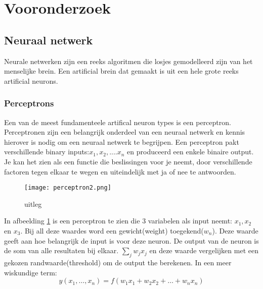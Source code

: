 \section{Vooronderzoek}

\subsection{Neuraal netwerk}
Neurale netwerken zijn een reeks algoritmen die losjes gemodelleerd zijn van het menselijke brein. Een artificial brein dat gemaakt is uit een hele grote reeks artificial neurons.

\subsubsection{Perceptrons}
Een van de meest fundamenteele artifical neuron types is een perceptron. Perceptronen zijn een belangrijk onderdeel van een neuraal netwerk en kennis hierover is nodig om een neuraal netwerk te begrijpen. Een perceptron pakt verschillende binary inputs:$x_{1}, x_{2},....x_{n}$ en produceerd een enkele binaire output. Je kan het zien als een functie die beslissingen voor je neemt, door verschillende factoren tegen elkaar te wegen en uiteindelijk met ja of nee te antwoorden.
\begin{figure}[h!]
\centering
\texttt{[image: perceptron2.png]}
\caption{uitleg}
\label{peceptron2}
\end{figure}
\linebreak
In afbeelding \ref{peceptron2} is een perceptron te zien die 3 variabelen als input neemt: $x_{1}, x_{2}$ en $x_{3}.$ Bij all deze waardes word een gewicht(weight) toegekend($w_{n}$). Deze waarde geeft aan hoe belangrijk de input is voor deze neuron. De output van de neuron is de som van alle resultaten bij elkaar. $\sum_{j}w_{j}x_{j}$ en deze waarde vergelijken met een gekozen randwaarde(threshold) om de output the berekenen. In een meer wiskundige term:
 \begin{equation}
    y(x_1,\ldots,x_n) = f(w_1x_1 + w_2x_2 + \ldots + w_nx_n)  \label{per-eq}
  \end{equation}

